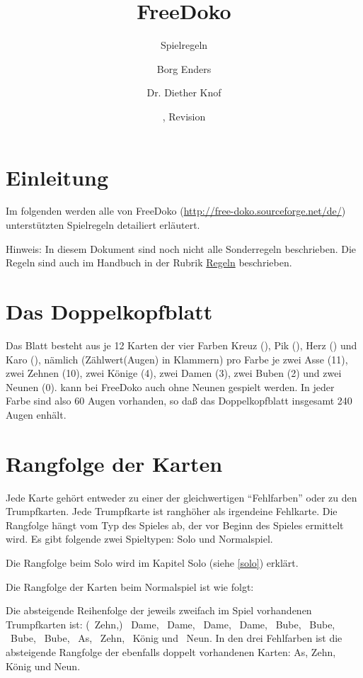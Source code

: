 \documentclass{scrartcl}
\title{FreeDoko}
\subtitle{Spielregeln}
\author{Borg Enders \and Dr. Diether Knof}
\date{\svnInfoLongDate, Revision \svnInfoRevision}
\begin{document}
\pagestyle{plain}

\maketitle

\tableofcontents

\section{Einleitung}

Im folgenden werden alle von FreeDoko (\href{http://free-doko.sourceforge.net/de/}{http://free-doko.sourceforge.net/de/}) unterstützten Spielregeln
detailiert erläutert.

Hinweis: In diesem Dokument sind noch nicht alle Sonderregeln beschrieben.
Die Regeln sind auch im Handbuch in der Rubrik \href{http://free-doko.sourceforge.net/doc/manual/de/operation/rules_config.html}{Regeln} beschrieben.


\section{Das Doppelkopfblatt}
Das Blatt besteht aus je 12 Karten der vier Farben Kreuz
(\Kreuz), Pik (\Pik), Herz (\Herz) und Karo (\Karo), nämlich
(Zählwert(Augen) in Klammern) pro Farbe je zwei Asse (11), zwei
Zehnen (10), zwei Könige (4), zwei Damen (3), zwei Buben (2) und
zwei Neunen (0). \Optional kann bei FreeDoko auch ohne Neunen
gespielt werden. In jeder Farbe sind also 60 Augen vorhanden, so
daß das Doppelkopfblatt insgesamt 240 Augen enhält.

\section{Rangfolge der Karten}

Jede Karte gehört entweder zu einer der gleichwertigen "`Fehlfarben"' oder zu den Trumpfkarten. Jede Trumpfkarte ist ranghöher als irgendeine Fehlkarte. Die Rangfolge hängt vom Typ des Spieles ab, der vor Beginn des Spieles ermittelt wird. Es gibt folgende zwei Spieltypen: Solo und Normalspiel.

Die Rangfolge beim Solo wird im Kapitel Solo (siehe \ref{solo}) erklärt.

Die Rangfolge der Karten beim Normalspiel ist wie folgt:

Die absteigende Reihenfolge der jeweils zweifach im Spiel vorhandenen Trumpfkarten ist: (\Herz\ Zehn,) \Kreuz\ Dame, \Pik\ Dame, \Herz\ Dame, \Karo\ Dame, \Kreuz\ Bube, \Pik\ Bube, \Herz\ Bube, \Karo\ Bube, \Karo\ As, \Karo\ Zehn, \Karo\ König und \Karo\ Neun. In den drei Fehlfarben ist die absteigende Rangfolge der ebenfalls doppelt vorhandenen Karten: As, Zehn, König und Neun.
\end{document}
